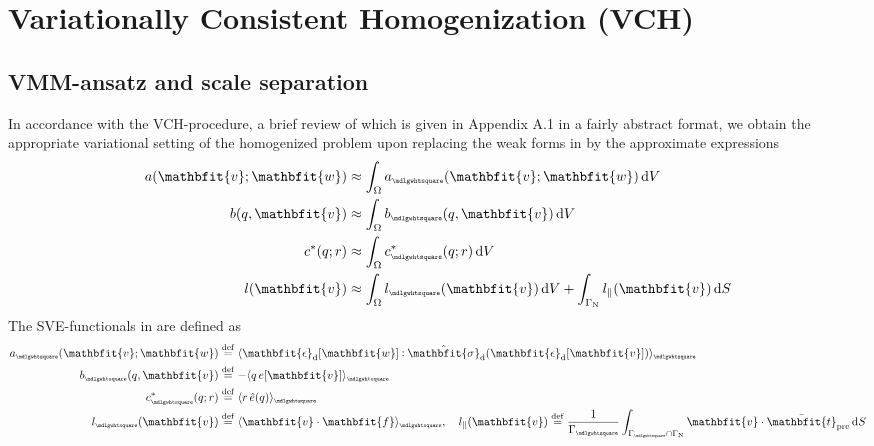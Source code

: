 \documentclass[12pt,a4paper]{article}
\renewcommand{\ta}[1]{\mathbfit{#1}}
\renewcommand{\ts}[1]{\mathbfit{#1}}
\renewcommand{\Box}{\mdlgwhtsquare}
\DeclarePairedDelimiter{\homgen}{\langle}{\rangle_\rve}
\newcommand{\prescribed}{\mathrm{pre}}
\renewcommand{\dev}{\mathrm{d}}
\newcommand{\rve}{
  {\mathchoice
   {\mbox{\scalebox{0.67}{$\Box$}}}
   {\mbox{\scalebox{0.67}{$\Box$}}}
   {\mbox{\scalebox{0.5}{$\Box$}}}
   {\mbox{\scalebox{0.375}{$\Box$}}}
  }
}
\begin{document}
\section{Variationally Consistent Homogenization (VCH)}

\subsection{VMM-ansatz and scale separation}

In accordance with the VCH-procedure, a brief review of which is given in Appendix A.1 in a fairly abstract format, we obtain the appropriate variational setting of the homogenized problem upon replacing the weak forms in  by the approximate expressions
\begin{align}
    a(\ta{v};\ta{w}) &\approx \int_\Omega a_\rve(\ta{v};\ta{w}) \dif V
\label{eq7a} \\
    b(q,\ta{v}) &\approx \int_\Omega b_\rve(q,\ta{v}) \dif V
\label{eq7b} \\
    c^*(q;r) &\approx \int_\Omega c^*_\rve(q;r) \dif V
\label{eq7c} \\
    l(\ta{v}) &\approx \int_\Omega l_\rve(\ta{v}) \dif V + \int_{\Gamma_\Neumann} l_\parallel(\ta{v}) \dif S
\label{eq7d}
\end{align}
The SVE-functionals in  are defined as
\begin{align}
    a_\rve(\ta{v};\ta{w}) &\defeq
    \homgen{ \ts{\epsilon}_\dev[\ta{w}]\dprod \hat{\ts{\sigma}}_\dev(\ts{\epsilon}_\dev[\ta{v}]) }
\label{eq8a} \\
    b_\rve(q,\ta{v}) &\defeq
    -  \homgen{ q\,e[\ta{v}] }
\label{eq8b} \\
    c^*_\rve(q;r) &\defeq
    \homgen{ r\,\hat{e}(q) }
\label{eq8c} \\
    l_\rve(\ta{v}) &\defeq
    \homgen{ \ta{v}\cdot\ta{f} }, \quad
    l_\parallel(\ta{v}) \defeq
    \frac{1}{\Gamma_\rve}\int_{\Gamma_\rve\cap\Gamma_\Neumann} \ta{v}\cdot\bar{\ta t}_\prescribed \dif S
\label{eq8d}
\end{align}
\end{document}
